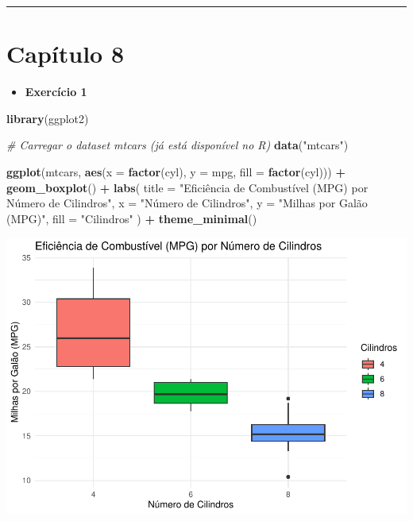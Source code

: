 \documentclass[
]{book}
\newenvironment{Shaded}{\begin{snugshade}}{\end{snugshade}}
\newcommand{\AttributeTok}[1]{\textcolor[rgb]{0.13,0.29,0.53}{#1}}
\newcommand{\CommentTok}[1]{\textcolor[rgb]{0.56,0.35,0.01}{\textit{#1}}}
\newcommand{\FunctionTok}[1]{\textcolor[rgb]{0.13,0.29,0.53}{\textbf{#1}}}
\newcommand{\NormalTok}[1]{#1}
\newcommand{\SpecialCharTok}[1]{\textcolor[rgb]{0.81,0.36,0.00}{\textbf{#1}}}
\newcommand{\StringTok}[1]{\textcolor[rgb]{0.31,0.60,0.02}{#1}}
\providecommand{\tightlist}{%
  \setlength{\itemsep}{0pt}\setlength{\parskip}{0pt}}
\begin{document}
\begin{center}\rule{0.5\linewidth}{0.5pt}\end{center}

\section{Capítulo 8}\label{capuxedtulo-8}

\begin{itemize}
\tightlist
\item
  \textbf{Exercício 1}
\end{itemize}

\begin{Shaded}
\begin{Highlighting}[]
\FunctionTok{library}\NormalTok{(ggplot2)}

\CommentTok{\# Carregar o dataset mtcars (já está disponível no R)}
\FunctionTok{data}\NormalTok{(}\StringTok{"mtcars"}\NormalTok{)}

\FunctionTok{ggplot}\NormalTok{(mtcars, }\FunctionTok{aes}\NormalTok{(}\AttributeTok{x =} \FunctionTok{factor}\NormalTok{(cyl), }\AttributeTok{y =}\NormalTok{ mpg, }\AttributeTok{fill =} \FunctionTok{factor}\NormalTok{(cyl))) }\SpecialCharTok{+}
  \FunctionTok{geom\_boxplot}\NormalTok{() }\SpecialCharTok{+}
  \FunctionTok{labs}\NormalTok{(}
    \AttributeTok{title =} \StringTok{"Eficiência de Combustível (MPG) por Número de Cilindros"}\NormalTok{,}
    \AttributeTok{x =} \StringTok{"Número de Cilindros"}\NormalTok{,}
    \AttributeTok{y =} \StringTok{"Milhas por Galão (MPG)"}\NormalTok{,}
    \AttributeTok{fill =} \StringTok{"Cilindros"} 
\NormalTok{  ) }\SpecialCharTok{+}
  \FunctionTok{theme\_minimal}\NormalTok{() }
\end{Highlighting}
\end{Shaded}

\begin{center}\includegraphics{AED_files/figure-latex/cap8_ex1-1} \end{center}
\end{document}
